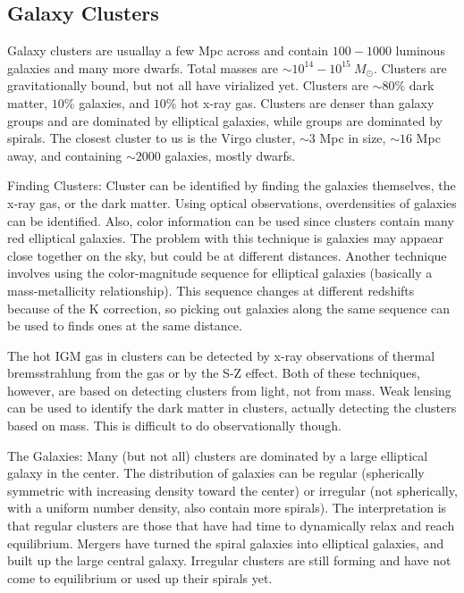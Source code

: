 \subsection{Galaxy Clusters}
Galaxy clusters are usuallay a few Mpc across and contain $100-1000$ luminous 
galaxies and many more dwarfs.  Total masses are 
$\sim10^{14}-10^{15}\ M_{\odot}$.  Clusters are gravitationally bound, but 
not all have virialized yet.  Clusters are $\sim80$\% dark matter, $10$\% 
galaxies, and $10$\% hot x-ray gas.  Clusters are denser than galaxy groups 
and are dominated by elliptical galaxies, while groups are dominated by 
spirals.  The closest cluster to us is the Virgo cluster, $\sim3$ Mpc in size, 
$\sim16$ Mpc away, and containing $\sim2000$ galaxies, mostly dwarfs.

Finding Clusters:\newline
Cluster can be identified by finding the galaxies themselves, the x-ray gas, 
or the dark matter.  Using optical observations, overdensities of 
galaxies can be identified.  Also, color information can be used since clusters 
contain many red elliptical galaxies.  The problem with this technique is 
galaxies may appaear close together on the sky, but could be at different 
distances.  Another technique involves using the color-magnitude sequence 
for elliptical galaxies (basically a mass-metallicity relationship).  This 
sequence changes at different redshifts because of the K correction, so 
picking out galaxies along the same sequence can be used to finds ones at the 
same distance.  

The hot IGM gas in clusters can be detected by x-ray observations of thermal 
bremsstrahlung from the gas or by the S-Z effect.  Both of these techniques, 
however, are based on detecting clusters from light, not from mass.  Weak 
lensing can be used to identify the dark matter in clusters, actually detecting 
the clusters based on mass.  This is difficult to do observationally though.  

The Galaxies:\newline
Many (but not all) clusters are dominated by a large elliptical galaxy in the 
center.  The distribution of galaxies can be regular (spherically symmetric 
with increasing density toward the center) or irregular (not spherically, 
with a uniform number density, also contain more spirals).  The interpretation 
is that regular clusters are those that have had time to dynamically relax 
and reach equilibrium.  Mergers have turned the spiral galaxies into elliptical 
galaxies, and built up the large central galaxy.  Irregular clusters 
are still forming and have not come to equilibrium or used up their spirals 
yet.  

